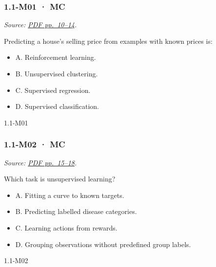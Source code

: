 \noindent\begin{minipage}{\linewidth}

\subsubsection{1.1-M01 · MC}\label{m01-mc}

\emph{Source:
\href{../Lecture\%20Slides/1.1.\%20Fundamentals.pdf\#page=10}{PDF
pp.~10--14}.}

Predicting a house's selling price from examples with known prices is:

\begin{itemize}
\tightlist
\item
  A. Reinforcement learning.
\item
  B. Unsupervised clustering.
\item
  C. Supervised regression.
\item
  D. Supervised classification.
\end{itemize}

\begin{solution}[8mm]{1.1-M01}

\end{solution}
\end{minipage}\par\medskip

\noindent\begin{minipage}{\linewidth}

\subsubsection{1.1-M02 · MC}\label{m02-mc}

\emph{Source:
\href{../Lecture\%20Slides/1.1.\%20Fundamentals.pdf\#page=15}{PDF
pp.~15--18}.}

Which task is unsupervised learning?

\begin{itemize}
\tightlist
\item
  A. Fitting a curve to known targets.
\item
  B. Predicting labelled disease categories.
\item
  C. Learning actions from rewards.
\item
  D. Grouping observations without predefined group labels.
\end{itemize}

\begin{solution}[8mm]{1.1-M02}

\end{solution}
\end{minipage}\par\medskip

